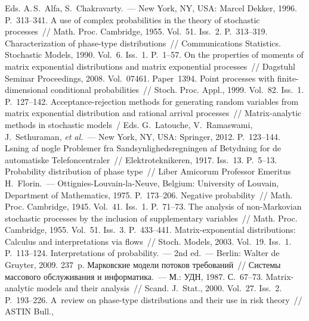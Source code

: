 \begin{multicols}{2}
{{\begin{thebibliography}{99}
Eds. A.\,S.~Alfa, S.~Chakravarty.~--- New York, NY, USA: Marcel 
Dekker, 1996. P.~313--341.
 A use of complex probabilities in the theory of stochastic processes~// Math. 
Proc. Cambridge, 1955. Vol.~51. Iss.~2. P.~313--319. 
 Characterization of phase-type distributions~// Communications Statistics. 
Stochastic Models, 1990. Vol.~6. Iss.~1. P.~1--57.
 On the properties of moments of matrix 
exponential distributions and matrix exponential processes~// Dagstuhl Seminar Proceedings, 2008. 
Vol.~07461. Paper~1394.
 Point processes with finite-dimensional conditional probabilities~// 
Stoch. Proc. \mbox{Appl.}, 1999. Vol.~82. Iss.~1. P.~127--142.
 Acceptance-rejection methods for generating random variables from 
matrix exponential distribution and rational arrival processes~// Matrix-analytic methods in stochastic 
models~/ Eds. G.~Latouche, V.~Ramaswami, J.~Sethuraman, \textit{et al.}~--- 
New York, NY, USA: Springer, 2012. P.~123--144.
 \mbox{L{\!\ptb{\o}}sning} af nogle Problemer fra Sandsynlighedsregningen af 
Betydning for de automatiske Telefoncentraler~// Elektroteknikeren, 1917. Iss.~13. P.~5--13.
 Probability distribution of phase type~// Liber Amicorum Professor Emeritus 
H.~Florin.~--- Ottignies-Louvain-la-Neuve, Belgium: University of Louvain, Department of Mathematics, 
1975. P.~173--206.
 Negative probability~// Math. Proc. Cambridge, 1945. Vol.~41. Iss.~1. P.~71--73.
 The analysis of non-Markovian stochastic processes by the inclusion of 
supplementary variables~// Math. Proc. Cambridge, 1955. Vol.~51. Iss.~3. P.~433--441. 
 Matrix-exponential distributions: Calculus and interpretations via flows~// 
Stoch. Models, 2003. Vol.~19. Iss.~1. P.~113--124.
 Interpretations of probability.~--- 2nd ed.~--- Berlin: Walter de Gruyter, 2009. 
237~p.
 Марковские модели потоков требований~// Системы массового 
обслуживания и информатика.~--- М.: УДН, 1987. С.~67--73.
 Matrix-analytic models and their analysis~// Scand. J.~Stat., 2000. 
Vol.~27. Iss.~2. P.~193--226.
 A~review on phase-type distributions and their use in risk theory~// ASTIN Bull., 

\end{thebibliography}}}
\end{multicols}
